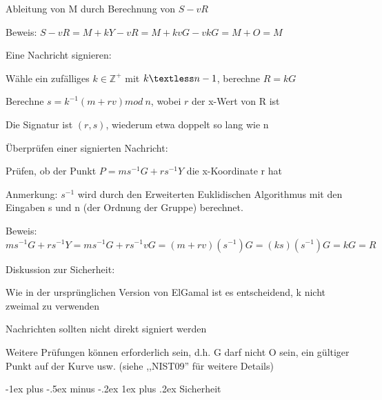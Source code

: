 \documentclass[a4paper]{article}
\makeatletter
\renewcommand{\subsubsection}{\@startsection{subsubsection}{3}{0mm}%
 {-1ex plus -.5ex minus -.2ex}%
 {1ex plus .2ex}%
 {\normalfont\small\bfseries}}
\makeatother
\begin{document}
\begin{multicols}{3}
\begin{itemize*}
            \begin{itemize*}
                  \item Ableitung von M durch Berechnung von $S-vR$
                  \item Beweis: $S-vR=M+kY-vR =M+kvG-vkG= M+O= M$
            \end{itemize*}
            \item Eine Nachricht signieren:
            \begin{itemize*}
                  \item Wähle ein zufälliges $k\in\mathbb{Z}^+$ mit $k\textless n-1$, berechne $R = kG$
                  \item Berechne $s=k^{-1}(m+rv) mod\ n$, wobei $r$ der x-Wert von R ist
                  \item Die Signatur ist $(r,s)$, wiederum etwa doppelt so lang wie n
            \end{itemize*}
            \item Überprüfen einer signierten Nachricht:
            \begin{itemize*}
                  \item Prüfen, ob der Punkt $P=ms^{-1}G+rs^{-1}Y$ die x-Koordinate r hat
                  \item Anmerkung: $s^{-1}$ wird durch den Erweiterten Euklidischen Algorithmus mit den Eingaben s und n (der Ordnung der Gruppe) berechnet.
                  \item Beweis: $ms^{-1}G+rs^{-1}Y = ms^{-1}G+rs^{-1}vG = (m+rv)(s^{-1})G = (ks)(s^{-1})G = kG = R$
            \end{itemize*}
            \item Diskussion zur Sicherheit:
            \begin{itemize*}
                  \item Wie in der ursprünglichen Version von ElGamal ist es entscheidend, k nicht zweimal zu verwenden
                  \item Nachrichten sollten nicht direkt signiert werden
                  \item Weitere Prüfungen können erforderlich sein, d.h. G darf nicht O sein, ein gültiger Punkt auf der Kurve usw. (siehe ,,NIST09'' für weitere Details)
            \end{itemize*}
      \end{itemize*}


      \subsubsection{Sicherheit}


\end{multicols}
\end{document}
